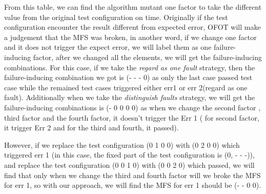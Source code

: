 \documentclass{sig-alternate}
\begin{document}
From this table, we can find the algorithm mutant one factor to take the different value from the original test configuration on time. Originally if the test configuration encounter the result different from expected error, OFOT will make a judgement that the MFS was broken, in another word, if we change one factor and it does not trigger the expect error, we will label them as one failure-inducing factor, after we changed all the elements, we will get the failure-inducing combinations. For this case, if we take the \emph{regard as one fault} strategy, then the failure-inducing combination we got is (- - - 0) as only the last case passed test case while the remained test cases triggered either err1 or err 2(regard as one fault).  Additionally when we take the \emph{distinguish faults} strategy, we will get the failure-inducing combinations is (- 0 0 0 0) as when we change the second factor , third factor and the fourth factor, it doesn't trigger the Err 1 ( for second factor, it trigger Err 2 and for the third and fourth, it passed).


However, if we replace the test configuration (0 1 0 0) with (0 2 0 0) which triggered err 1 (in this case, the fixed part of the test configuration is (0, - - -)), and replace the test configuration (0 0 1 0) with (0 0 2 0) which passed, we will find that only when we change the third and fourth factor will we broke the MFS for err 1, so with our approach, we will find the MFS for err 1 should be (- - 0 0).
\end{document}
